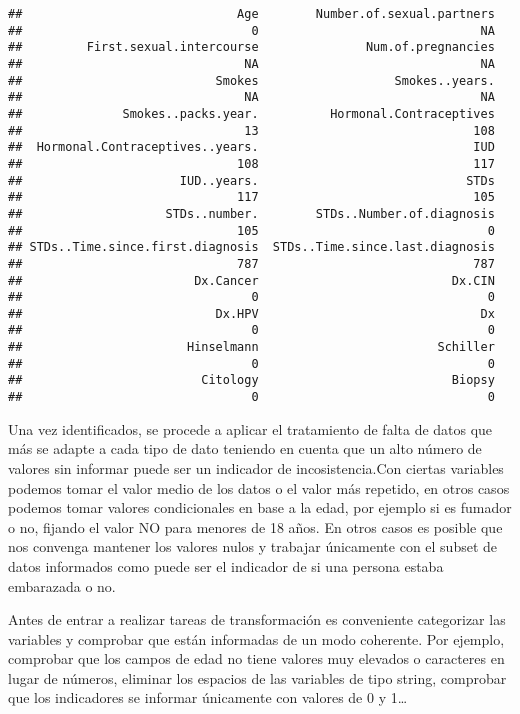 \documentclass[
]{article}
\begin{document}
\begin{verbatim}
##                              Age        Number.of.sexual.partners 
##                                0                               NA 
##         First.sexual.intercourse               Num.of.pregnancies 
##                               NA                               NA 
##                           Smokes                   Smokes..years. 
##                               NA                               NA 
##              Smokes..packs.year.          Hormonal.Contraceptives 
##                               13                              108 
##  Hormonal.Contraceptives..years.                              IUD 
##                              108                              117 
##                      IUD..years.                             STDs 
##                              117                              105 
##                    STDs..number.        STDs..Number.of.diagnosis 
##                              105                                0 
## STDs..Time.since.first.diagnosis  STDs..Time.since.last.diagnosis 
##                              787                              787 
##                        Dx.Cancer                           Dx.CIN 
##                                0                                0 
##                           Dx.HPV                               Dx 
##                                0                                0 
##                       Hinselmann                         Schiller 
##                                0                                0 
##                         Citology                           Biopsy 
##                                0                                0
\end{verbatim}

Una vez identificados, se procede a aplicar el tratamiento de falta de
datos que más se adapte a cada tipo de dato teniendo en cuenta que un
alto número de valores sin informar puede ser un indicador de
incosistencia.Con ciertas variables podemos tomar el valor medio de los
datos o el valor más repetido, en otros casos podemos tomar valores
condicionales en base a la edad, por ejemplo si es fumador o no, fijando
el valor NO para menores de 18 años. En otros casos es posible que nos
convenga mantener los valores nulos y trabajar únicamente con el subset
de datos informados como puede ser el indicador de si una persona estaba
embarazada o no.

Antes de entrar a realizar tareas de transformación es conveniente
categorizar las variables y comprobar que están informadas de un modo
coherente. Por ejemplo, comprobar que los campos de edad no tiene
valores muy elevados o caracteres en lugar de números, eliminar los
espacios de las variables de tipo string, comprobar que los indicadores
se informar únicamente con valores de 0 y 1\ldots{}
\end{document}
